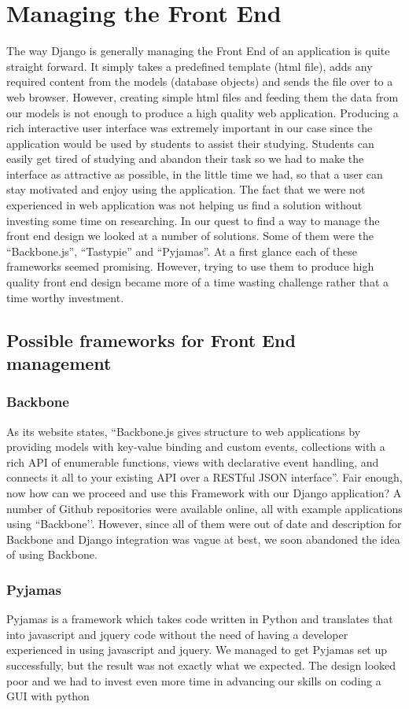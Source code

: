 \documentclass{l3proj}
\begin{document}
\section{Managing the Front End}
The way Django is generally managing the Front End of an application is quite 
straight forward. It simply takes a predefined template (html file), adds any required 
content from the models (database objects) and sends the file over to a web browser. 
However, creating simple html files and feeding them the data from our models is not 
enough to produce a high quality web application. Producing a rich interactive user interface was extremely important in our case since the application would be used by students to assist their studying. Students can easily get tired of studying and abandon their task so we had to make the interface as attractive as possible, in the little time we had, so that a user can stay motivated and enjoy using the application. The fact that we were not 
experienced in web application was not helping us find a solution without investing 
some time on researching. In our quest to find a way to manage the front end design 
we looked at a number of solutions. Some of them were the ``Backbone.js'', ``Tastypie'' 
and ``Pyjamas''. At a first glance each of these frameworks seemed promising. 
However, trying to use them to produce high quality front end design became more of 
a time wasting challenge rather that a time worthy investment.
\subsection{Possible frameworks for Front End management}
\subsubsection{Backbone}
As its website states, ``Backbone.js gives structure to web applications by providing 
models with key-value binding and custom events, collections with a rich API of 
enumerable functions, views with declarative event handling, and connects it all to 
your existing API over a RESTful JSON interface''. Fair enough, now how can we 
proceed and use this Framework with our Django application? A number of Github 
repositories were available online, all with example applications using ``Backbone’’. 
However, since all of them were out of date and description for Backbone and 
Django integration was vague at best, we soon abandoned the idea of using 
Backbone. 
\subsubsection{Pyjamas}
Pyjamas is a framework which takes code written in Python and translates that 
into javascript and jquery code without the need of having a developer experienced 
in using javascript and jquery. We managed to get Pyjamas set up successfully, 
but the result was not exactly what we expected. The design looked poor and we 
had to invest even more time in advancing our skills on coding a GUI with python
\end{document}
